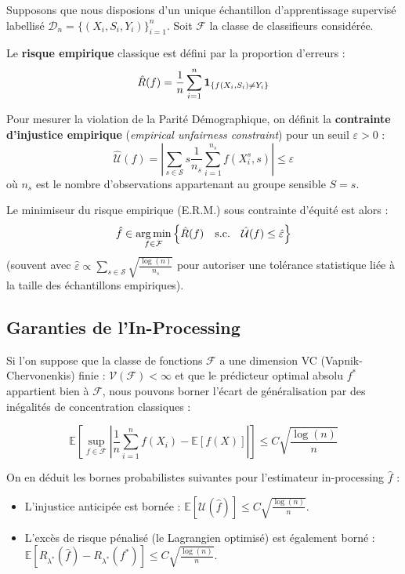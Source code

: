 Supposons que nous disposions d'un unique échantillon d'apprentissage supervisé labellisé $\mathcal{D}_n = \{(X_i, S_i, Y_i)\}_{i=1}^n$.
Soit $\mathcal{F}$ la classe de classifieurs considérée.

Le \textbf{risque empirique} classique est défini par la proportion d'erreurs :
\begin{equation}
    \hat{R}(f) = \frac{1}{n} \sum_{i=1}^n \mathbf{1}_{\{f(X_i, S_i) \neq Y_i\}}
\end{equation}

Pour mesurer la violation de la Parité Démographique, on définit la \textbf{contrainte d'injustice empirique} (\textit{empirical unfairness constraint}) pour un seuil $\varepsilon > 0$ :
\begin{equation}
    \hat{\mathcal{U}}(f) = \left| \sum_{s \in \mathcal{S}} s \frac{1}{n_s} \sum_{i=1}^{n_s} f(X_i^s, s) \right| \le \varepsilon
\end{equation}
où $n_s$ est le nombre d'observations appartenant au groupe sensible $S=s$.

Le minimiseur du risque empirique (E.R.M.) sous contrainte d'équité est alors :
\begin{equation}
    \hat{f} \in \operatorname*{arg\,min}_{f \in \mathcal{F}} \left\{ \hat{R}(f) \quad \text{s.c.} \quad \hat{\mathcal{U}}(f) \le \hat{\varepsilon} \right\}
\end{equation}
(souvent avec $\hat{\varepsilon} \propto \sum_{s \in \mathcal{S}} \sqrt{\frac{\log(n)}{n_s}}$ pour autoriser une tolérance statistique liée à la taille des échantillons empiriques).

\subsection{Garanties de l'In-Processing}

Si l'on suppose que la classe de fonctions $\mathcal{F}$ a une dimension VC (Vapnik-Chervonenkis) finie : $\mathcal{V}(\mathcal{F}) < \infty$ et que le prédicteur optimal absolu $f^*$ appartient bien à $\mathcal{F}$, nous pouvons borner l'écart de généralisation par des inégalités de concentration classiques :

\begin{equation}
    \mathbb{E} \left[ \sup_{f \in \mathcal{F}} \left| \frac{1}{n}\sum_{i=1}^n f(X_i) - \mathbb{E}[f(X)] \right| \right] \le C \sqrt{\frac{\log(n)}{n}}
\end{equation}

On en déduit les bornes probabilistes suivantes pour l'estimateur in-processing $\hat{f}$ :
\begin{itemize}
    \item L'injustice anticipée est bornée : $\mathbb{E} [\mathcal{U}(\hat{f})] \le C \sqrt{\frac{\log(n)}{n}}$.
    \item L'excès de risque pénalisé (le Lagrangien optimisé) est également borné : $\mathbb{E} [R_{\lambda^*}(\hat{f}) - R_{\lambda^*}(f^*)] \le C \sqrt{\frac{\log(n)}{n}}$.
\end{itemize}

